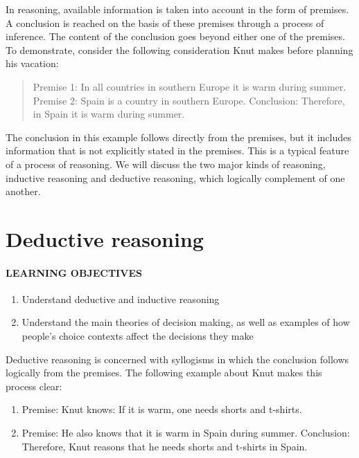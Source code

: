 \documentclass[
]{krantz}
\providecommand{\tightlist}{%
  \setlength{\itemsep}{0pt}\setlength{\parskip}{0pt}}
\begin{document}
In reasoning, available information is taken into account in the form of premises. A conclusion is reached on the basis of these premises through a process of inference. The content of the conclusion goes beyond either one of the premises. To demonstrate, consider the following consideration Knut makes before planning his vacation:

\begin{quote}
Premise 1: In all countries in southern Europe it is warm during summer.
Premise 2: Spain is a country in southern Europe.
Conclusion: Therefore, in Spain it is warm during summer.
\end{quote}

The conclusion in this example follows directly from the premises, but it includes information that is not explicitly stated in the premises. This is a typical feature of a process of reasoning. We will discuss the two major kinds of reasoning, inductive reasoning and deductive reasoning, which logically complement of one another.

\hypertarget{deductive-reasoning}{%
\section{Deductive reasoning}\label{deductive-reasoning}}

\hypertarget{learning-objectives-8}{%
\paragraph*{LEARNING OBJECTIVES}\label{learning-objectives-8}}

\begin{enumerate}
\def\labelenumi{\arabic{enumi}.}
\tightlist
\item
  Understand deductive and inductive reasoning
\item
  Understand the main theories of decision making, as well as examples of how people's choice contexts affect the decisions they make
\end{enumerate}

Deductive reasoning is concerned with syllogisms in which the conclusion follows logically from the premises. The following example about Knut makes this process clear:

\begin{enumerate}
\def\labelenumi{\arabic{enumi}.}
\tightlist
\item
  Premise: Knut knows: If it is warm, one needs shorts and t-shirts.
\item
  Premise: He also knows that it is warm in Spain during summer.
  Conclusion: Therefore, Knut reasons that he needs shorts and t-shirts in Spain.
\end{enumerate}
\end{document}
